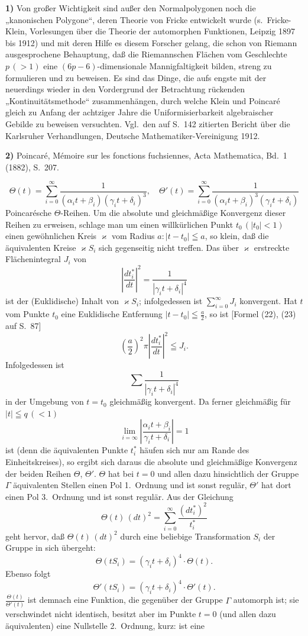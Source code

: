 \documentclass{article}
\begin{document}
\textbf{1)} Von großer Wichtigkeit sind außer den Normalpolygonen noch die „kanonischen Polygone“, deren Theorie von Fricke entwickelt wurde (s.\ Fricke-Klein, Vorlesungen über die Theorie der automorphen Funktionen, Leipzig 1897 bis 1912) und mit deren Hilfe es diesem Forscher gelang, die schon von Riemann ausgesprochene Behauptung, daß die Riemannschen Flächen vom Geschlechte $p\,(> 1)$ eine $(6p - 6)$-dimensionale Mannigfaltigkeit bilden, streng zu formulieren und zu beweisen. Es sind das Dinge, die aufs engste mit der neuerdings wieder in den Vordergrund der Betrachtung rückenden „Kontinuitätsmethode“ zusammenhängen, durch welche Klein und Poincaré gleich zu Anfang der achtziger Jahre die Uniformisierbarkeit algebraischer Gebilde zu beweisen versuchten. Vgl.\ den auf S.~142 zitierten Bericht über die Karlsruher Verhandlungen, Deutsche Mathematiker-Vereinigung 1912.

\textbf{2)} Poincaré, Mémoire sur les fonctions fuchsiennes, Acta Mathematica, Bd.~1 (1882), S.~207.

\[ \Theta(t) = \sum_{i=0}^\infty \frac{1}{(\alpha_i t + \beta_i)(\gamma_i t + \delta_i)^3}, \quad \Theta'(t) = \sum_{i=0}^\infty \frac{1}{(\alpha_i t + \beta_i)^3(\gamma_i t + \delta_i)} \]
Poincarésche $\Theta$-Reihen. Um die absolute und gleichmäßige Konvergenz dieser Reihen zu erweisen, schlage man um einen willkürlichen Punkt $t_0\,(|t_0| < 1)$ einen gewöhnlichen Kreis $\varkappa$ vom Radius $a\colon |t - t_0| \leqq a$, so klein, daß die äquivalenten Kreise $\varkappa S_i$ sich gegenseitig nicht treffen. Das über $\varkappa$ erstreckte Flächenintegral $J_i$ von
\[ \left| \frac{dt_i^*}{dt} \right|^2 = \frac{1}{|\gamma_i t + \delta_i|^4} \]
ist der (Euklidische) Inhalt von $\varkappa S_i$; infolgedessen ist $\displaystyle\sum_{i=0}^\infty J_i$ konvergent. Hat $t$ vom Punkte $t_0$ eine Euklidische Entfernung $|t - t_0| \leqq \frac{a}{2}$, so ist [Formel (22), (23) auf S.~87]
\[ \left( \frac{a}{2} \right)^2 \pi \left| \frac{dt_i^*}{dt} \right|^2 \leqq J_i. \]
Infolgedessen ist
\[ \sum \frac{1}{|\gamma_i t + \delta_i|^4} \]
in der Umgebung von $t = t_0$ gleichmäßig konvergent. Da ferner gleichmäßig für $|t| \leqq q\,(< 1)$
\[ \lim_{i = \infty} \left| \frac{\alpha_i t + \beta_i}{\gamma_i t + \delta_i} \right| = 1 \]
ist (denn die äquivalenten Punkte $t_i^*$ häufen sich nur am Rande des Einheitskreises), so ergibt sich daraus die absolute und gleichmäßige Konvergenz der beiden Reihen $\Theta$, $\Theta'$. $\Theta$ hat bei $t = 0$ und allen dazu hinsichtlich der Gruppe $\varGamma$ äquivalenten Stellen einen Pol 1.~Ordnung und ist sonst regulär, $\Theta'$ hat dort einen Pol 3.~Ordnung und ist sonst regulär. Aus der Gleichung
\[ \Theta(t)\,(dt)^2 = \sum_{i=0}^\infty \frac{(dt_i^*)^2}{t_i^*} \]
geht hervor, daß $\Theta(t)\,(dt)^2$ durch eine beliebige Transformation $S_i$ der Gruppe in sich übergeht:
\[ \Theta(tS_i) = (\gamma_i t + \delta_i)^4 \cdot \Theta(t). \]
Ebenso folgt
\[ \Theta'(tS_i) = (\gamma_i t + \delta_i)^4 \cdot \Theta'(t). \]
$\frac{\Theta(t)}{\Theta'(t)}$ ist demnach eine Funktion, die gegenüber der Gruppe $\varGamma$ automorph ist; sie verschwindet nicht identisch, besitzt aber im Punkte $t = 0$ (und allen dazu äquivalenten) eine Nullstelle 2.~Ordnung, kurz: ist eine
\end{document}
